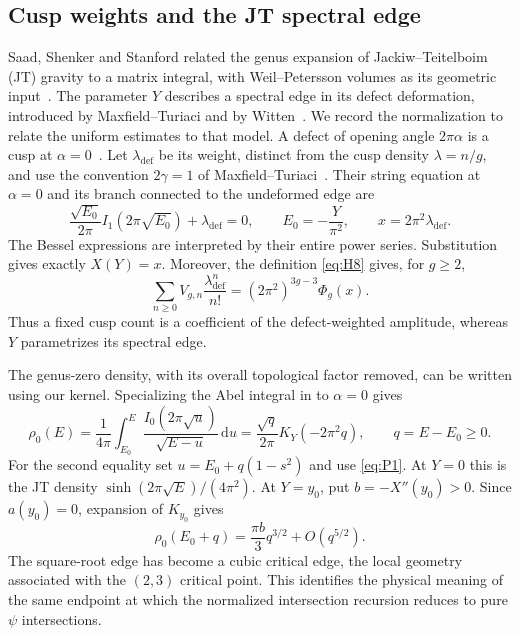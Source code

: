 \subsection{Cusp weights and the JT spectral edge}\label{subsec:jt-edge}

Saad, Shenker and Stanford related the genus expansion of
Jackiw--Teitelboim (JT) gravity to a matrix integral, with
Weil--Petersson volumes as its geometric input~\cite{SSS}.
The parameter $Y$ describes a spectral edge in its defect deformation,
introduced by Maxfield--Turiaci and by Witten~\cite{MT,WittenDef}.
We record the normalization to relate the
uniform estimates to that model. A defect of opening angle $2\pi\alpha$
is a cusp at $\alpha=0$~\cite[Section~2]{ET}.
Let $\lambda_{\mathrm{def}}$ be its weight, distinct from the cusp
density $\lambda=n/g$, and use the convention $2\gamma=1$ of
Maxfield--Turiaci~\cite{MT}. Their string equation at $\alpha=0$
and its branch connected to the undeformed edge are
\[
 \frac{\sqrt{E_0}}{2\pi}I_1(2\pi\sqrt{E_0})
       +\lambda_{\mathrm{def}}=0,\qquad
 E_0=-\frac{Y}{\pi^2},\qquad x=2\pi^2\lambda_{\mathrm{def}}.
\]
The Bessel expressions are interpreted by their entire power series.
Substitution gives exactly $X(Y)=x$. Moreover, the definition
\eqref{eq:H8} gives, for $g\ge2$,
\[
 \sum_{n\ge0}V_{g,n}\frac{\lambda_{\mathrm{def}}^n}{n!}
       =(2\pi^2)^{3g-3}\Phi_g(x).
\]
Thus a fixed cusp count is a coefficient of the defect-weighted
amplitude, whereas $Y$ parametrizes its spectral edge.

The genus-zero density, with its overall topological factor removed,
can be written using our kernel. Specializing the Abel integral in
\cite[equation~(3.50)]{MT} to $\alpha=0$ gives
\[
 \rho_0(E)=\frac1{4\pi}\int_{E_0}^{E}
        \frac{I_0(2\pi\sqrt u)}{\sqrt{E-u}}\,\mathrm du
   =\frac{\sqrt q}{2\pi}K_Y(-2\pi^2q),\qquad q=E-E_0\ge0.
\]
For the second equality set $u=E_0+q(1-s^2)$ and use
\eqref{eq:P1}. At $Y=0$ this is the JT density
$\sinh(2\pi\sqrt E)/(4\pi^2)$. At $Y=y_0$, put
$b=-X''(y_0)>0$. Since $a(y_0)=0$, expansion of $K_{y_0}$ gives
\[
 \rho_0(E_0+q)=\frac{\pi b}{3}q^{3/2}+O(q^{5/2}).
\]
The square-root edge has become a cubic critical edge, the local
geometry associated with the $(2,3)$ critical point. This identifies
the physical meaning of the same endpoint at which the normalized
intersection recursion reduces to pure $\psi$ intersections.

